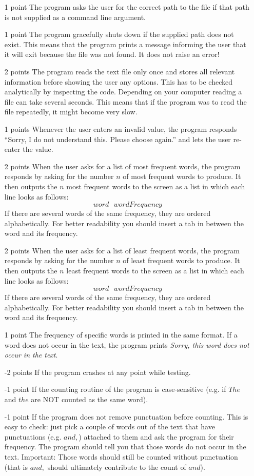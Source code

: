 \documentclass[11pt, leqno, a4paper]{article}
\begin{document}
\begin{itemize}
\item[1 point] The program asks the user for the correct path to the file if that path is not supplied as a command line argument.
\item[1 point] The program gracefully shuts down if the supplied path does not exist. This means that the program prints a message informing the user
that it will exit because the file was not found. It does not raise an error!
\item[2 points] The program reads the text file only once and stores all relevant information before showing the user any options. This has to
be checked analytically by inspecting the code. Depending on your computer reading a file can take several seconds. This means that if the program was to read the file repeatedly, it might become very slow.
\item[1 points] Whenever the user enters an invalid value, the program responds ``Sorry, I do not understand this. Please choose again.'' and lets the
user re-enter the value.
\item[2 points] When the user asks for a list of most frequent words, the program responds by asking for the number $ n $ of most frequent words to 
produce. It then outputs the $ n $ most frequent words to the screen as a list in which each line looks as follows:
$$ word~~~wordFrequency $$
If there are several words of the same frequency, they are ordered alphabetically. For better readability
you should insert a tab in between the word and its frequency.
\item[2 points] When the user asks for a list of least frequent words, the program responds by asking for the number $ n $ of least frequent words to 
produce. It then outputs the $ n $ least frequent words to the screen as a list in which each line looks as follows:
$$ word~~~wordFrequency $$
If there are several words of the same frequency, they are ordered alphabetically.  For better readability
you should insert a tab in between the word and its frequency.
\item[1 point] The frequency of specific words is printed in the same format. If a word does not occur in the text, the program prints \textit{Sorry, this
word does not occur in the text}.
\item[-2 points] If the program crashes at any point while testing.
\item[-1 point] If the counting routine of the program is case-sensitive (e.g. if $ The $ and $ the $ are NOT counted as the same word).
\item[-1 point] If the program does not remove punctuation before counting. This is easy to check: just
pick a couple of words out of the text that have punctuations (e.g. $ and, $) attached to them and ask the program for their frequency. The program should tell you that those words do not occur in the text. Important: Those words should still be counted without punctuation (that is $ and, $ should ultimately
contribute to the count of $ and $).
\end{itemize}
\end{document}
